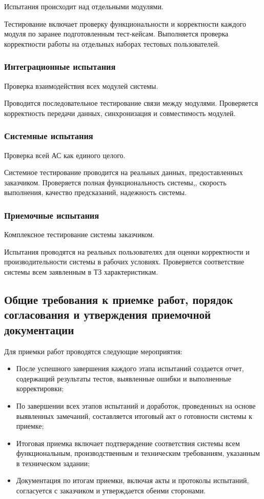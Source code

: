 Испытания происходит над отдельными модулями.

Тестирование включает проверку функциональности
и корректности каждого модуля по заранее подготовленным тест-кейсам.
Выполняется проверка корректности работы на отдельных наборах тестовых пользователей.
  
\subsubsection{Интеграционные испытания}

Проверка взаимодействия всех модулей системы.

Проводится последовательное тестирование связи между модулями.
Проверяется корректность передачи данных, синхронизация
и совместимость модулей.

\subsubsection{Системные испытания}

Проверка всей АС как единого целого.

Системное тестирование проводится на реальных данных,
предоставленных заказчиком.
Проверяется полная функциональность системы,,
скорость выполнения, качество предсказаний, надежность системы.

\subsubsection{Приемочные испытания}

Комплексное тестирование системы заказчиком.

Испытания проводятся на реальных пользователях для оценки корректности
и производительности системы в рабочих условиях.
Проверяется соответствие системы всем заявленным в ТЗ характеристикам.

\subsection{Общие требования к приемке работ,
	порядок согласования и утверждения приемочной документации}

Для приемки работ проводятся следующие мероприятия:

\begin{itemize}
	\item После успешного завершения каждого этапа испытаний создается отчет,
		содержащий результаты тестов,
		выявленные ошибки и выполненные корректировки;
	\item По завершении всех этапов испытаний и доработок,
		проведенных на основе выявленных замечаний,
		составляется итоговый акт о готовности системы к приемке;
	\item Итоговая приемка включает подтверждение соответствия системы
		всем функциональным, производственным и техническим требованиям,
		указанным в техническом задании;
	\item Документация по итогам приемки, включая акты и протоколы испытаний,
		согласуется с заказчиком и утверждается обеими сторонами.
\end{itemize}

